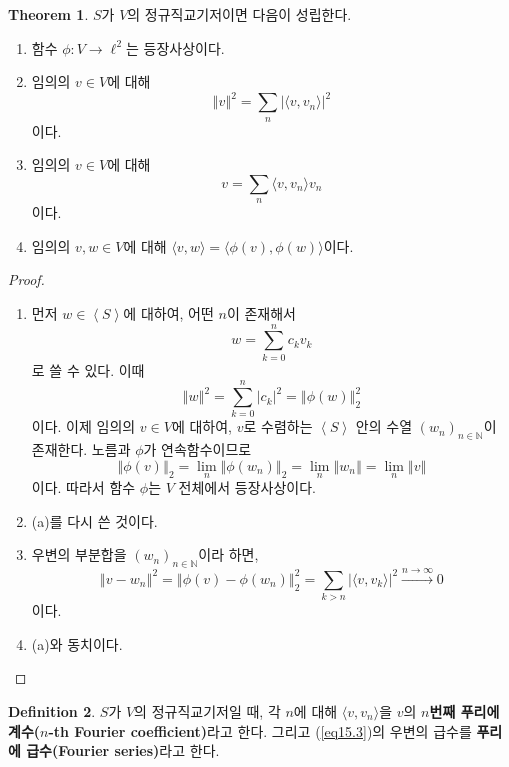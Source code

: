 \documentclass[11pt]{book}
\numberwithin{equation}{chapter}
\def\NN{\mathbb{N}}
\newcommand{\inner}[2]{\langle#1, #2\rangle}
\newcommand{\abs}[1]{\left\vert#1\right\vert}
\newcommand{\norm}[1]{\left\Vert#1\right\Vert}
\newcommand{\gen}[1]{\left\langle#1\right\rangle}
\theoremstyle{definition}
\newtheorem{thm}{Theorem}[section]
\newtheorem{defn}[thm]{Definition}
\newenvironment{enum}
	{\begin{enumerate}[label=(\alph*), leftmargin=2\parindent]}
	{\end{enumerate}}
\begin{document}
\begin{thm}
    \(S\)가 \(V\)의 정규직교기저이면 다음이 성립한다.
    \begin{enum}
        \item 함수 \(\phi : V \to \ell^2\)는 등장사상이다.
        \item 임의의 \(v \in V\)에 대해
        \[
            \norm{v}^2 = \sum_n \abs{\inner{v}{v_n}}^2
        \]
        이다.
        \item 임의의 \(v \in V\)에 대해
        \begin{equation} \label{eq15.3}
            v = \sum_n \inner{v}{v_n} v_n
        \end{equation}
        이다.
        \item 임의의 \(v, w \in V\)에 대해 \(\inner{v}{w} = \inner{\phi(v)}{\phi(w)}\)이다.
    \end{enum}
    
\end{thm}
\begin{proof}
    \quad

    \begin{enum}
        \item 먼저 \(w \in \gen{S}\)에 대하여, 어떤 \(n\)이 존재해서
        \[
            w = \sum_{k=0}^n c_k v_k
        \]
        로 쓸 수 있다. 이때
        \[
            \norm{w}^2 = \sum_{k=0}^n \abs{c_k}^2 = \norm{\phi(w)}_2^2
        \]
        이다. 이제 임의의 \(v \in V\)에 대하여, \(v\)로 수렴하는 \(\gen{S}\) 안의 수열 \((w_n)_{n \in \NN}\)이 존재한다. 노름과 \(\phi\)가 연속함수이므로
        \[
            \norm{\phi(v)}_2 = \lim_{n} \norm{\phi(w_n)}_2 = \lim_n \norm{w_n} = \lim_n \norm{v}
        \]
        이다. 따라서 함수 \(\phi\)는 \(V\) 전체에서 등장사상이다.
        \item (a)를 다시 쓴 것이다.
        \item 우변의 부분합을 \((w_n)_{n \in \NN}\)이라 하면,
        \[
            \norm{v - w_n}^2 = \norm{\phi(v) - \phi(w_n)}_2^2 = \sum_{k > n} \abs{\inner{v}{v_k}}^2 \xrightarrow[]{n \to \infty} 0
        \]
        이다.
        \item (a)와 동치이다.
    \end{enum}
    
\end{proof}

\begin{defn}
    \(S\)가 \(V\)의 정규직교기저일 때, 각 \(n\)에 대해 \(\inner{v}{v_n}\)을 \(v\)의 \textbf{\(n\)번째 푸리에 계수(\(n\)-th Fourier coefficient)}라고 한다. 그리고 (\ref{eq15.3})의 우변의 급수를 \textbf{푸리에 급수(Fourier series)}라고 한다.
\end{defn}
\end{document}

